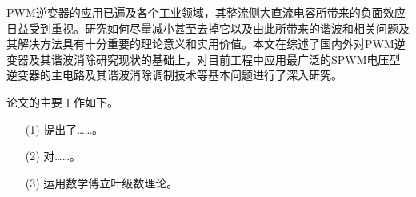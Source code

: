 \neepuconclusion
\bodystyle
PWM逆变器的应用已遍及各个工业领域，其整流侧大直流电容所带来的负面效应日益受到重视。研究如何尽量减小甚至去掉它以及由此所带来的谐波和相关问题及其解决方法具有十分重要的理论意义和实用价值。本文在综述了国内外对PWM逆变器及其谐波消除研究现状的基础上，对目前工程中应用最广泛的SPWM电压型逆变器的主电路及其谐波消除调制技术等基本问题进行了深入研究。\par
论文的主要工作如下。
\begin{itemize}[topsep=0pt,itemsep=0pt,parsep=0pt,leftmargin=1.5cm]
\item[(1)] 提出了……。
\item[(2)] 对……。
\item[(3)] 运用数学傅立叶级数理论。
\end{itemize}